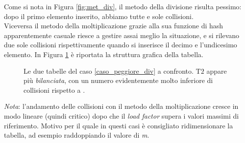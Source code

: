 Come si nota in Figura \ref{fig:met_div}, il metodo della divisione risulta pessimo: dopo il primo elemento inserito, abbiamo tutte e sole collisioni.
\\ Viceversa il metodo della moltiplicazione grazie alla sua funzione di hash apparentemente casuale riesce a gestire assai meglio la situazione, e si rilevano due sole collisioni rispettivamente quando si inserisce il decimo e l'undicesimo elemento. In Figura \ref{fig:tikz:worstcase} è riportata la struttura grafica della tabella.

\begin{figure}[htp]
  
  \captionsetup{justification=centering}
  \caption{Le due tabelle del caso \ref{caso_peggiore_div} a confronto. $\text{T2}$ appare più \emph{bilanciata}, con un numero evidentemente molto inferiore di collisioni rispetto a .}
  \label{fig:tikz:worstcase}
\end{figure}

\textit{Nota}: l'andamento delle collisioni con il metodo della moltiplicazione cresce in modo lineare (quindi critico) dopo che il \textit{load factor} supera i valori massimi di riferimento. Motivo per il quale in questi casi è consigliato ridimensionare la tabella, ad esempio raddoppiando il valore di \textit{m}.
